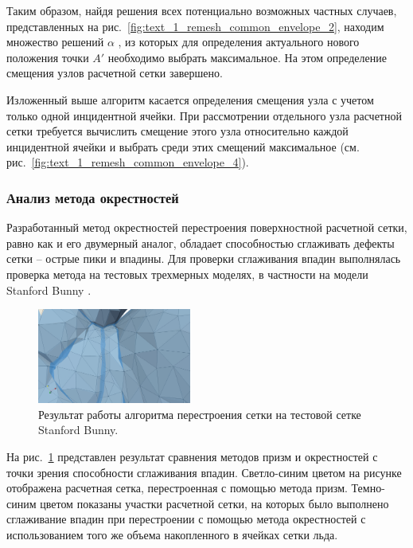 Таким образом, найдя решения всех потенциально возможных частных случаев, представленных на рис.~\ref{fig:text_1_remesh_common_envelope_2}, находим множество решений $\alpha$ , из которых для определения актуального нового положения точки $A'$ необходимо выбрать максимальное.
На этом определение смещения узлов расчетной сетки завершено.

Изложенный выше алгоритм касается определения смещения узла с учетом только одной инцидентной ячейки.
При рассмотрении отдельного узла расчетной сетки требуется вычислить смещение этого узла относительно каждой инцидентной ячейки и выбрать среди этих смещений максимальное (см. рис.~\ref{fig:text_1_remesh_common_envelope_4}).

\subsubsection{Анализ метода окрестностей}

Разработанный метод окрестностей перестроения поверхностной расчетной сетки, равно как и его двумерный аналог, обладает способностью сглаживать дефекты сетки -- острые пики и впадины.
Для проверки сглаживания впадин выполнялась проверка метода на тестовых трехмерных моделях, в частности на модели Stanford Bunny \cite{StanfordModels}.

\begin{figure}[ht]
\centering
\includegraphics[width=0.45\textwidth]{fig/3dr_bunny_cave.png}
\singlespacing
{}\caption{Результат работы алгоритма перестроения сетки на тестовой сетке Stanford Bunny.}
\label{fig:text_1_remesh3_common_envelope_bunny}
\end{figure}

На рис.~\ref{fig:text_1_remesh3_common_envelope_bunny} представлен результат сравнения методов призм и окрестностей с точки зрения способности сглаживания впадин.
Светло-синим цветом на рисунке отображена расчетная сетка, перестроенная с помощью метода призм.
Темно-синим цветом показаны участки расчетной сетки, на которых было выполнено сглаживание впадин при перестроении с помощью метода окрестностей с использованием того же объема накопленного в ячейках сетки льда.


